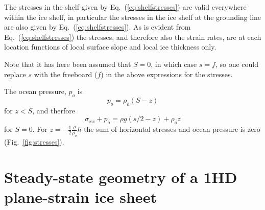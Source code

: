 \documentclass[10pt,a4paper]{book}
\newcommand{\p}{\partial}
\begin{document}
The stresses in the shelf given by Eq.~(\ref{eq:shelfstresses}) are valid everywhere within the ice
shelf, in particular the stresses in the ice shelf at the grounding line are also given by
Eq.~(\ref{eq:shelfstresses}). As is evident from Eq.~(\ref{eq:shelfstresses}) the stresses,
and therefore also the strain rates, are at each location functions of local surface slope and local
ice thickness only.

Note that it has here been assumed that $S=0$, in which case $s=f$, so
one could replace $s$ with the freeboard ($f$) in the above
expressions for the stresses.


The ocean pressure, $p_o$ is
\[
 p_o=  \rho_o (S-z)
\]
for $z<S$, and therfore
\[
 \sigma_{xx}+p_o= \rho g (s/2-z) + \rho_o z
\]
for $S=0$. For $z=-\frac{1}{2} \frac{\rho}{\rho_o} h$ the sum of
horizontal stresses and ocean pressure is zero
(Fig.~\ref{fig:stresses}).



% 
% 
% 
% 
% 
% 
% 

\section{Steady-state geometry of a 1HD plane-strain ice sheet}
\end{document}
